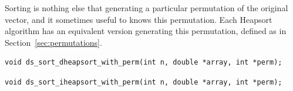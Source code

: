 Sorting is nothing else that generating a particular permutation of
the original vector, and it sometimes useful to knows this
permutation.
Each Heapsort algorithm has an equivalent version generating this
permutation, defined as in Section~\ref{sec:permutations}.

\begin{verbatim}
void ds_sort_dheapsort_with_perm(int n, double *array, int *perm);
\end{verbatim}

\begin{verbatim}
void ds_sort_iheapsort_with_perm(int n, double *array, int *perm);
\end{verbatim}
